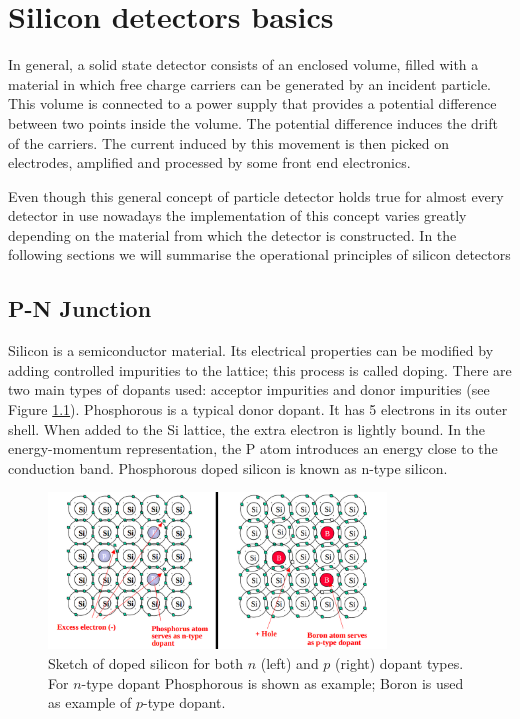 \clearpage
{}  %
\chapter{Silicon detectors basics} %
\label{chap:detector}

In general, a solid state detector consists of an enclosed volume, filled with a material in
which free charge carriers can be generated by an incident particle. This volume
is connected to a power supply that provides a  potential difference between two
points inside the volume. The potential difference induces the drift of the
carriers. The current induced by this movement is then picked on electrodes,
amplified and processed by some front end electronics.

Even though this general concept of particle detector holds true for almost
every detector in use nowadays the implementation of this concept varies greatly
depending on the material from which the detector is constructed. In the
following sections we will summarise the operational principles of silicon
detectors

\section{P-N Junction}

Silicon is a semiconductor material. Its electrical properties can be modified
by adding controlled impurities to the lattice; this process is called doping.
There are two main types of dopants used: acceptor impurities and donor
impurities (see Figure \ref{fig:dopingSi}). Phosphorous is a typical donor dopant. It has 5 electrons in its
outer shell. When added to the Si lattice, the extra electron is lightly bound.
In the energy-momentum representation, the P atom introduces an energy close to
the conduction band. Phosphorous doped silicon is known as n-type silicon. 

\begin{figure}[H]
	\centering
	\includegraphics[width=0.8\textwidth]{Dopants_Si.png}
	\caption{Sketch of doped silicon for both $n$ (left) and $p$ (right) dopant types. For $n$-type dopant Phosphorous is shown as example; Boron is used as example of $p$-type dopant.}
	\label{fig:dopingSi}
\end{figure}

